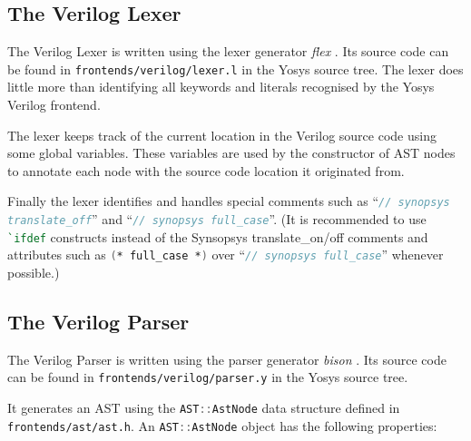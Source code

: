 \subsection{The Verilog Lexer}

\begin{sloppypar}
The Verilog Lexer is written using the lexer generator {\it flex} . Its source code
can be found in {\tt frontends/verilog/lexer.l} in the Yosys source tree.
The lexer does little more than identifying all keywords and literals
recognised by the Yosys Verilog frontend.
\end{sloppypar}

The lexer keeps track of the current location in the Verilog source code using
some global variables. These variables are used by the constructor of AST nodes
to annotate each node with the source code location it originated from.

\begin{sloppypar}
Finally the lexer identifies and handles special comments such as
``\lstinline[language=Verilog]{// synopsys translate_off}'' and
``\lstinline[language=Verilog]{// synopsys full_case}''. (It is recommended to
use \lstinline[language=Verilog]{`ifdef} constructs instead of the Synsopsys
translate\_on/off comments and attributes such as
\lstinline[language=Verilog]{(* full_case *)} over ``\lstinline[language=Verilog]{// synopsys full_case}''
whenever possible.)
\end{sloppypar}

\subsection{The Verilog Parser}

The Verilog Parser is written using the parser generator {\it bison} . Its source code
can be found in {\tt frontends/verilog/parser.y} in the Yosys source tree.

It generates an AST using the \lstinline[language=C++]{AST::AstNode} data structure
defined in {\tt frontends/ast/ast.h}. An \lstinline[language=C++]{AST::AstNode} object has
the following properties:


